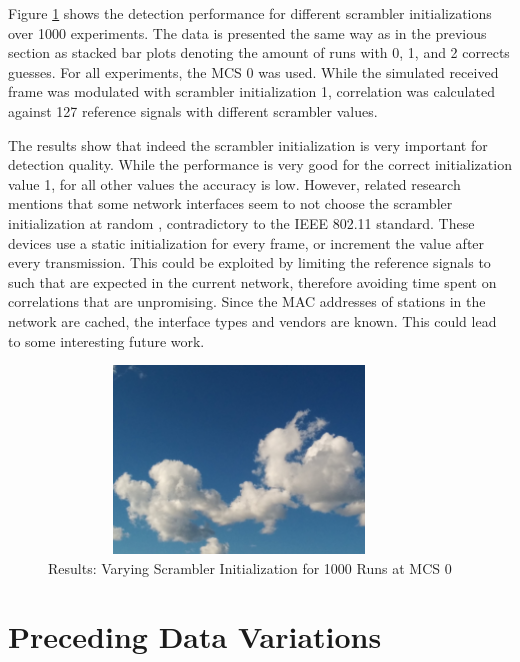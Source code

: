 Figure \ref{fig:vary_scrambler} shows the detection performance for different scrambler initializations over 1000 experiments. The data is presented the same way as in the previous section as stacked bar plots denoting the amount of runs with 0, 1, and 2 corrects guesses. For all experiments, the \gls{MCS} 0 was used. While the simulated received frame was modulated with scrambler initialization 1, correlation was calculated against 127 reference signals with different scrambler values.

The results show that indeed the scrambler initialization is very important for detection quality. While the performance is very good for the correct initialization value 1, for all other values the accuracy is low. However, related research mentions that some network interfaces seem to not choose the scrambler initialization at random \cite{noubir2016}, contradictory to the IEEE 802.11 standard. These devices use a static initialization for every frame, or increment the value after every transmission. This could be exploited by limiting the reference signals to such that are expected in the current network, therefore avoiding time spent on correlations that are unpromising. Since the MAC addresses of stations in the network are cached, the interface types and vendors are known. This could lead to some interesting future work.

\begin{figure}[H]
	\centering
	\includegraphics[width=0.9\textwidth,height=5cm]{gfx/images/stock-clouds}
	\caption[Results: Varying Scrambler Initialization for 1000 Experiments]{Results: Varying Scrambler Initialization for 1000 Runs at MCS 0}
	\label{fig:vary_scrambler}
\end{figure}



\section{Preceding Data Variations}\label{sec:ex-destination}

